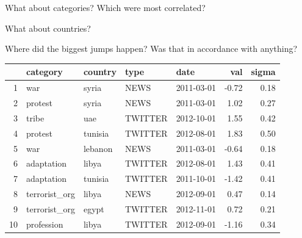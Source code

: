 What about categories? Which were most correlated?

What about countries?

Where did the biggest jumps happen? Was that in accordance with anything?

\begin{table}[ht]
\centering
\begin{tabular}{rllllrr}
  \hline
 & category & country & type & date & val & sigma \\ 
  \hline
1 & war & syria & NEWS & 2011-03-01 & -0.72 & 0.18 \\ 
  2 & protest & syria & NEWS & 2011-03-01 & 1.02 & 0.27 \\ 
  3 & tribe & uae & TWITTER & 2012-10-01 & 1.55 & 0.42 \\ 
  4 & protest & tunisia & TWITTER & 2012-08-01 & 1.83 & 0.50 \\ 
  5 & war & lebanon & NEWS & 2011-03-01 & -0.64 & 0.18 \\ 
  6 & adaptation & libya & TWITTER & 2012-08-01 & 1.43 & 0.41 \\ 
  7 & adaptation & tunisia & TWITTER & 2011-10-01 & -1.42 & 0.41 \\ 
  8 & terrorist\_org & libya & NEWS & 2012-09-01 & 0.47 & 0.14 \\ 
  9 & terrorist\_org & egypt & TWITTER & 2012-11-01 & 0.72 & 0.21 \\ 
  10 & profession & libya & TWITTER & 2012-09-01 & -1.16 & 0.34 \\ 
   \hline
\end{tabular}
\end{table}
%
